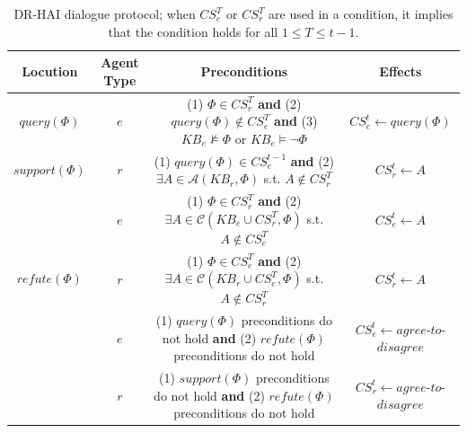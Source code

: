 \documentclass{ecai}
\begin{document}
\begin{table}[t]
 \centering 
 \renewcommand{\arraystretch}{1.0}
\begin{tabular}{ |c|c|c|c| } 
\hline
\textbf{Locution} & \textbf{Agent Type} &\textbf{Preconditions} & \textbf{Effects} \\
\hline
\hline

$query(\Phi)$  & $e$ & \makecell[l]{(1) $\Phi \in CS_r^T$ \textbf{and} \\
(2) $query(\Phi)\not \in CS_e^T$ \textbf{and}  \\ 
(3) $KB_e \not \models \Phi$ or $KB_e \models \neg \Phi$} 
& $CS^t_e \gets query(\Phi)$ \\
\hline


$support(\Phi)$  & $r$ & \makecell[l]{(1) $query(\Phi)\in CS_e^{t-1}$ \textbf{and} \\
(2) $\exists A \in \mathcal{A}(KB_r, \Phi)$ s.t. $A \not \in CS_r^T$} 
& $CS^t_r \gets A$ \\
\hline



\multirow{3}{*}{$refute(\Phi)$}  & $e$ & \makecell[l]{(1) $\Phi \in CS_r^{T}$ \textbf{and} \\
(2) $\exists A \in \mathcal{C}(KB_e \cup CS_r^{T}, \Phi)$ s.t. $A\not \in CS_e^T$} 
& $CS^t_e \gets A$ \\
\cline{2-4}
  & $r$ & \makecell[l]{(1) $\Phi \in CS_e^{T}$ \textbf{and} \\
(2) $\exists A \in \mathcal{C}(KB_r \cup CS_e^{T}, \Phi)$ s.t. $A\not \in CS_r^T$} 
& $CS^t_r \gets A$ \\
\hline



\multirow{3}{*}{$agree$-$to$-$disagree$} & $e$ & \makecell[l]{(1)  $query(\Phi)$ preconditions do not hold  \textbf{and} \\
(2) $refute(\Phi)$ preconditions do not hold}
&$CS^t_e \gets agree$-$to$-$disagree$  \\
\cline{2-4}
 & $r$ & \makecell[l]{(1)  $support(\Phi)$ preconditions do not hold  \textbf{and} \\
(2) $refute(\Phi)$ preconditions do not hold }
&$CS^t_r \gets agree$-$to$-$disagree$  \\

\hline
\end{tabular}
\caption{DR-HAI dialogue protocol; when $CS_e^T$ or $CS_r^T$ are used in a condition, it implies that the condition holds for all $1 \leq T \leq t-1$.} %
\label{DR_semantics}
\end{table}
\end{document}
